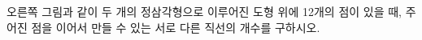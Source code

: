 \noindent\begin{minipage}[t]{0.58\linewidth}\vspace{0pt}\raggedright 오른쪽 그림과 같이 두 개의 정삼각형으로 이루어진 도형 위에 12개의 점이 있을 때, 주어진 점을 이어서 만들 수 있는 서로 다른 직선의 개수를 구하시오.\end{minipage}\hfill\begin{minipage}[t]{0.4\linewidth}\vspace{0pt}\centering \resizebox{\ifdim\width>\linewidth\linewidth\else\width\fi}{!}{}\end{minipage}\par
